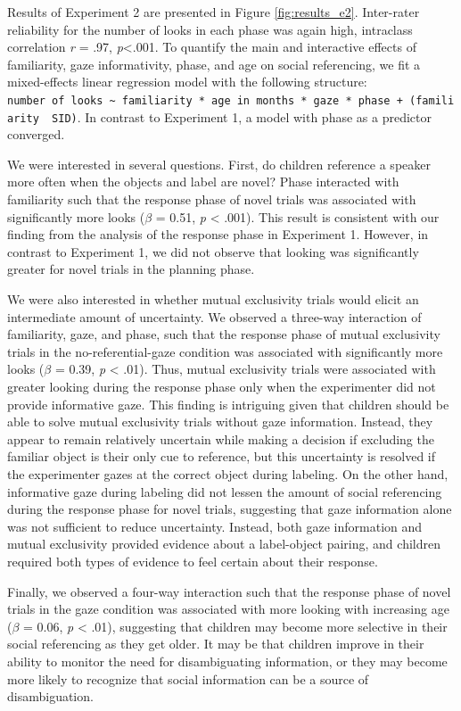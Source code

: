 \documentclass[10pt, letterpaper]{article}
\begin{document}
Results of Experiment 2 are presented in Figure \ref{fig:results_e2}.
Inter-rater reliability for the number of looks in each phase was again
high, intraclass correlation \emph{r} = .97, \emph{p}\textless{}.001. To
quantify the main and interactive effects of familiarity, gaze
informativity, phase, and age on social referencing, we fit a
mixed-effects linear regression model with the following structure:
\texttt{number\ of\ looks\ \textasciitilde{}\ familiarity\ *\ age\ in\ months\ *\ gaze\ *\ phase\ +\ (familiarity\ \textbar{}\ SID)}.
In contrast to Experiment 1, a model with phase as a predictor
converged.

We were interested in several questions. First, do children reference a
speaker more often when the objects and label are novel? Phase
interacted with familiarity such that the response phase of novel trials
was associated with significantly more looks (\(\beta\) = 0.51, \emph{p}
\textless{} .001). This result is consistent with our finding from the
analysis of the response phase in Experiment 1. However, in contrast to
Experiment 1, we did not observe that looking was significantly greater
for novel trials in the planning phase.

We were also interested in whether mutual exclusivity trials would
elicit an intermediate amount of uncertainty. We observed a three-way
interaction of familiarity, gaze, and phase, such that the response
phase of mutual exclusivity trials in the no-referential-gaze condition
was associated with significantly more looks (\(\beta\) = 0.39, \emph{p}
\textless{} .01). Thus, mutual exclusivity trials were associated with
greater looking during the response phase only when the experimenter did
not provide informative gaze. This finding is intriguing given that
children should be able to solve mutual exclusivity trials without gaze
information. Instead, they appear to remain relatively uncertain while
making a decision if excluding the familiar object is their only cue to
reference, but this uncertainty is resolved if the experimenter gazes at
the correct object during labeling. On the other hand, informative gaze
during labeling did not lessen the amount of social referencing during
the response phase for novel trials, suggesting that gaze information
alone was not sufficient to reduce uncertainty. Instead, both gaze
information and mutual exclusivity provided evidence about a
label-object pairing, and children required both types of evidence to
feel certain about their response.

Finally, we observed a four-way interaction such that the response phase
of novel trials in the gaze condition was associated with more looking
with increasing age (\(\beta\) = 0.06, \emph{p} \textless{} .01),
suggesting that children may become more selective in their social
referencing as they get older. It may be that children improve in their
ability to monitor the need for disambiguating information, or they may
become more likely to recognize that social information can be a source
of disambiguation.
\end{document}
